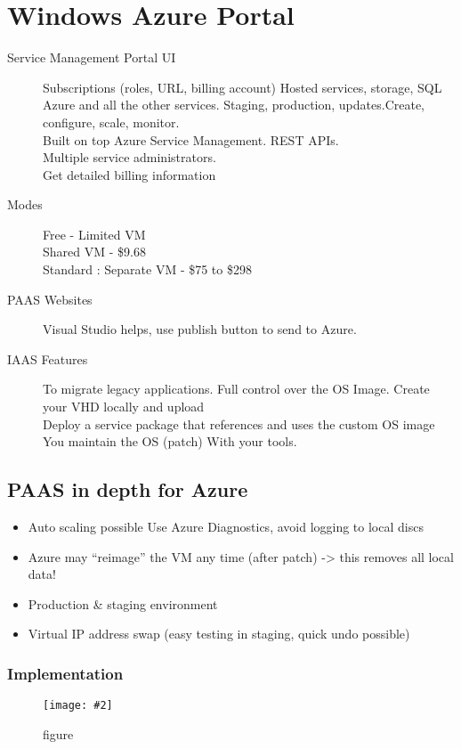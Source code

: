 \documentclass[a4paper,10pt]{scrreprt}
\newcommand{\pic}[2][figure]{\begin{figure}[h]
 \centering
 \texttt{[image: \#2]}
 \caption{#1}
\end{figure}
}
\begin{document}
\section{Windows Azure Portal}
\begin{description}

\item[Service Management Portal UI] Subscriptions (roles, URL, billing account) Hosted services, storage, SQL Azure 
and all the other services. Staging, production, updates.Create, configure, scale, monitor.\\
Built on top Azure Service Management.
REST APIs.\\
Multiple service administrators.\\
Get detailed billing information\\
\item [Modes] Free  - Limited VM \\
Shared VM - \$9.68\\
Standard : Separate VM -  \$75 to \$298
\item [PAAS Websites] Visual Studio helps, use publish button to send to Azure.
\item [IAAS Features] To migrate legacy applications. Full control over the OS Image. Create
your VHD locally and upload\\
Deploy a service package that
references and uses the custom
OS image\\
You maintain the OS (patch) With your tools. 
\end{description}
\subsection{PAAS in depth for Azure}
\begin{itemize}
 \item Auto scaling possible
Use Azure Diagnostics, avoid
logging to local discs
\item  Azure may “reimage” the VM any
time (after patch) -> this removes all
local data!
\item  Production \& staging environment
\item  Virtual IP address swap (easy testing
in staging, quick undo possible)
\end{itemize}

\subsubsection{Implementation}
\pic{implcl.png}
\end{document}
